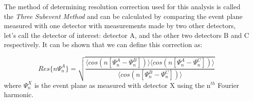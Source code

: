The method of determining resolution correction used for this analysis is called the \textit{Three Subevent Method} and can be calculated by comparing the event plane measured with one detector with measurements made by two other detectors, let's call the detector of interest: detector A, and the other two detectors B and C respectively. It can be shown \citep{PhysRevC.58.1671} that we can define this correction as:

\begin{equation}
\label{eqn3se}
Res\{n \Psi_n^{A}\} = \sqrt{\frac{\langle cos(n[\Psi_n^{A}-\Psi_n^{B}])\rangle \langle cos(n[\Psi_n^{A}-\Psi_n^{C}])\rangle}{\langle cos(n[\Psi_n^{B}-\Psi_n^{C}])\rangle}}
\end{equation} 
where $\Psi_n^X$ is the event plane as measured with detector X using the n$^{th}$ Fourier harmonic.
\pagebreak
\pagebreak
